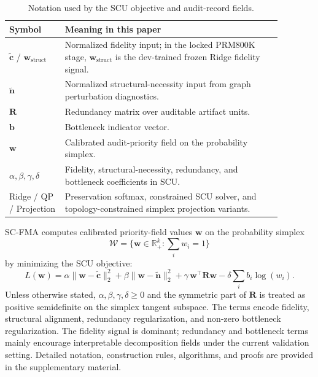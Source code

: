 \documentclass[a4paper,fleqn]{cas-sc}
\newcommand{\wstruct}{\ensuremath{\mathbf{w}_{\mathrm{struct}}}}
\begin{document}
\begin{table}[ht]
\caption{Notation used by the SCU objective and audit-record fields.}
\label{tab:notation}
\centering
\small
\renewcommand{\arraystretch}{1.08}
\begin{tabular}{Z{0.18\linewidth}Z{0.70\linewidth}}
\toprule
\textbf{Symbol} & \textbf{Meaning in this paper} \\
\midrule
$\tilde{\mathbf{c}}$ / \wstruct{} & Normalized fidelity input; in the locked PRM800K stage, \wstruct{} is the dev-trained frozen Ridge fidelity signal. \\
$\tilde{\mathbf{n}}$ & Normalized structural-necessity input from graph perturbation diagnostics. \\
$\mathbf{R}$ & Redundancy matrix over auditable artifact units. \\
$\mathbf{b}$ & Bottleneck indicator vector. \\
$\mathbf{w}$ & Calibrated audit-priority field on the probability simplex. \\
$\alpha,\beta,\gamma,\delta$ & Fidelity, structural-necessity, redundancy, and bottleneck coefficients in SCU. \\
Ridge / QP / Projection & Preservation softmax, constrained SCU solver, and topology-constrained simplex projection variants. \\
\bottomrule
\end{tabular}
\end{table}

SC-FMA computes calibrated priority-field values $\mathbf{w}$ on the probability simplex
\begin{equation}
\mathcal{W}=\{\mathbf{w}\in\mathbb{R}_{+}^{k}: \sum_i w_i = 1\}
\label{eq:scu-feasible-set}
\end{equation}
by minimizing the SCU objective:
\begin{equation}
L(\mathbf{w}) =
\alpha\|\mathbf{w} - \tilde{\mathbf{c}}\|_2^2
+ \beta\|\mathbf{w} - \tilde{\mathbf{n}}\|_2^2
+ \gamma\,\mathbf{w}^{\top}\mathbf{R}\mathbf{w}
- \delta\sum_i b_i \log(w_i).
\label{eq:scu}
\end{equation}
Unless otherwise stated, $\alpha,\beta,\gamma,\delta \ge 0$ and the symmetric part of $\mathbf{R}$ is treated as positive semidefinite on the simplex tangent subspace. The terms encode fidelity, structural alignment, redundancy regularization, and non-zero bottleneck regularization. The fidelity signal is dominant; redundancy and bottleneck terms mainly encourage interpretable decomposition fields under the current validation setting. Detailed notation, construction rules, algorithms, and proofs are provided in the supplementary material.
\end{document}
